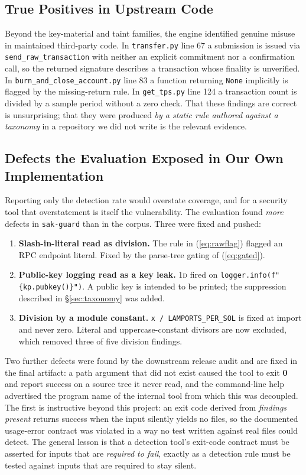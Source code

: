 \subsection{True Positives in Upstream Code}

Beyond the key-material and taint families, the engine identified genuine
misuse in maintained third-party code. In \texttt{transfer.py} line 67 a
submission is issued via \texttt{send\_raw\_transaction} with neither an
explicit commitment nor a confirmation call, so the returned signature
describes a transaction whose finality is unverified. In
\texttt{burn\_and\_close\_account.py} line 83 a function returning
\texttt{None} implicitly is flagged by the missing-return rule. In
\texttt{get\_tps.py} line 124 a transaction count is divided by a sample
period without a zero check. That these findings are correct is unsurprising;
that they were produced \emph{by a static rule authored against a taxonomy} in
a repository we did not write is the relevant evidence.

\subsection{Defects the Evaluation Exposed in Our Own Implementation}

Reporting only the detection rate would overstate coverage, and for a security
tool that overstatement is itself the vulnerability. The evaluation found
\emph{more} defects in \texttt{sak-guard} than in the corpus. Three were fixed
and pushed:

\begin{enumerate}
\item \textbf{Slash-in-literal read as division.} The rule in
  (\ref{eq:rawflag}) flagged an RPC endpoint literal. Fixed by the parse-tree
  gating of (\ref{eq:gated}).
\item \textbf{Public-key logging read as a key leak.} \textsc{1d} fired on
  \texttt{logger.info(f"\{kp.pubkey()\}")}. A public key is intended to be
  printed; the suppression described in \S\ref{sec:taxonomy} was added.
\item \textbf{Division by a module constant.} \texttt{x / LAMPORTS\_\allowbreak PER\_\allowbreak SOL}
  is fixed at import and never zero. Literal and uppercase-constant divisors
  are now excluded, which removed three of five division findings.
\end{enumerate}

Two further defects were found by the downstream release audit and are fixed
in the final artifact: a path argument that did not exist caused the tool to
exit \textbf{0} and report success on a source tree it never read, and the
command-line help advertised the program name of the internal tool from which
this was decoupled. The first is instructive beyond this project: an exit code
derived from \emph{findings present} returns success when the input silently
yields no files, so the documented usage-error contract was violated in a way
no test written against real files could detect. The general lesson is that a
detection tool's exit-code contract must be asserted for inputs that are
\emph{required to fail}, exactly as a detection rule must be tested against
inputs that are required to stay silent.

